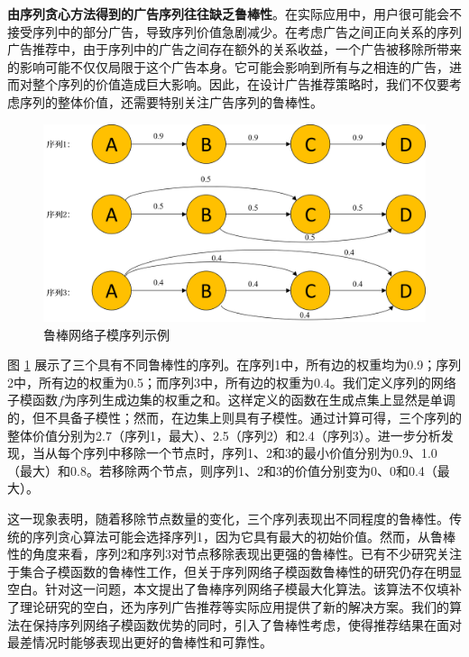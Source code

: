 \textbf{由序列贪心方法得到的广告序列往往缺乏鲁棒性}。在实际应用中，用户很可能会不接受序列中的部分广告，导致序列价值急剧减少。在考虑广告之间正向关系的序列广告推荐中，由于序列中的广告之间存在额外的关系收益，一个广告被移除所带来的影响可能不仅仅局限于这个广告本身。它可能会影响到所有与之相连的广告，进而对整个序列的价值造成巨大影响。因此，在设计广告推荐策略时，我们不仅要考虑序列的整体价值，还需要特别关注广告序列的鲁棒性。

\begin{figure}[th]
    \centering
    \includegraphics[width=.89\linewidth]{figure/rosenets/sample1}
    \caption{鲁棒网络子模序列示例}
    \label{fig:robust_sample}
\end{figure}

图 \ref{fig:robust_sample} 展示了三个具有不同鲁棒性的序列。在序列1中，所有边的权重均为0.9；序列2中，所有边的权重为0.5；而序列3中，所有边的权重为0.4。我们定义序列的网络子模函数$f$为序列生成边集的权重之和。这样定义的函数在生成点集上显然是单调的，但不具备子模性；然而，在边集上则具有子模性。通过计算可得，三个序列的整体价值分别为2.7（序列1，最大）、2.5（序列2）和2.4（序列3）。进一步分析发现，当从每个序列中移除一个节点时，序列1、2和3的最小价值分别为0.9、1.0（最大）和0.8。若移除两个节点，则序列1、2和3的价值分别变为0、0和0.4（最大）。

这一现象表明，随着移除节点数量的变化，三个序列表现出不同程度的鲁棒性。传统的序列贪心算法\cite{tschiatschek2017selecting,mitrovic2018submodularity}可能会选择序列1，因为它具有最大的初始价值。然而，从鲁棒性的角度来看，序列2和序列3对节点移除表现出更强的鲁棒性。已有不少研究关注于集合子模函数的鲁棒性工作\cite{orlin2018robust,bogunovic2017robust,mitrovic2017streaming,tzoumas2017resilient}，但关于序列网络子模函数鲁棒性的研究仍存在明显空白。针对这一问题，本文提出了鲁棒序列网络子模最大化算法。该算法不仅填补了理论研究的空白，还为序列广告推荐等实际应用提供了新的解决方案。我们的算法在保持序列网络子模函数优势的同时，引入了鲁棒性考虑，使得推荐结果在面对最差情况时能够表现出更好的鲁棒性和可靠性。

